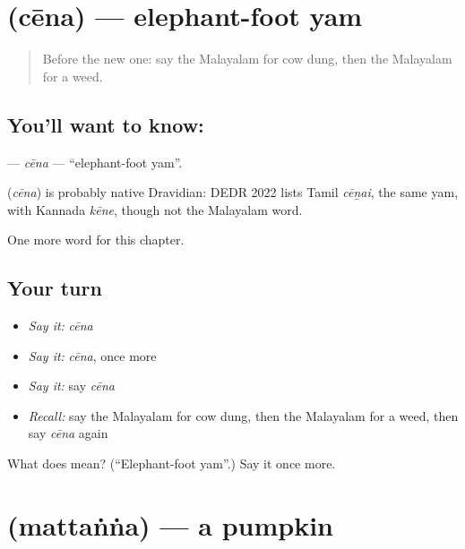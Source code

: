 \section[\texorpdfstring{\ml{ചേന} (cēna)}{ചേന (cēna)}]{ (cēna) — elephant-foot yam}

\label{lesson:ML-C218-cena}



\begin{quote}
Before the new one: say the Malayalam for cow dung, then the Malayalam for a weed.
\end{quote}

\subsection*{You'll want to know: }
\textbf{} — \emph{cēna} — \textquotedblleft{}elephant-foot yam\textquotedblright{}.

\begin{cousinweb}
\textbf{} (\emph{cēna}) is probably native Dravidian: DEDR 2022 lists Tamil \emph{cēṉai}, the same yam, with Kannada \emph{kēne}, though not the Malayalam word.
\end{cousinweb}

\begin{grammarlens}[title={What you've built}]
One more word for this chapter.
\end{grammarlens}

\subsection*{Your turn}
\begin{itemize}
\raggedright
  \item \emph{Say it:} \emph{cēna}
  \item \emph{Say it:} \emph{cēna}, once more
  \item \emph{Say it:} say \emph{cēna}
  \item \emph{Recall:} say the Malayalam for cow dung, then the Malayalam for a weed, then say \emph{cēna} again
\end{itemize}

\begin{tcolorbox}[breakable,colback=teal!4,colframe=teal!35!black,title={Before you move on}]
What does  mean? (\textquotedblleft{}Elephant-foot yam\textquotedblright{}.) Say it once more.
\end{tcolorbox}
\section[\texorpdfstring{\ml{മത്തങ്ങ} (mattaṅṅa)}{മത്തങ്ങ (mattaṅṅa)}]{ (mattaṅṅa) — a pumpkin}

